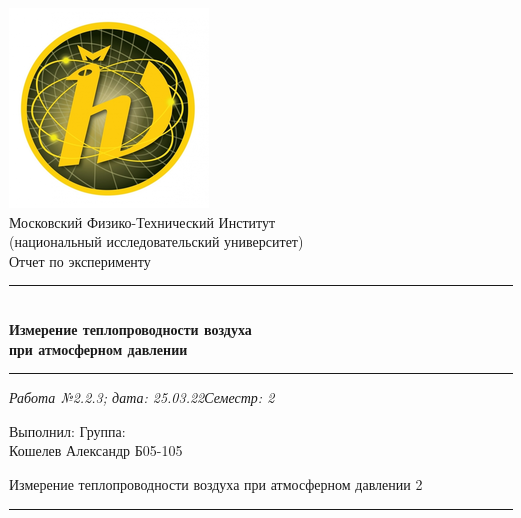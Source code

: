 \documentclass[12pt,a4paper]{scrartcl}
\begin{document}
	\begin{titlepage}
		
		\vspace*{\fill}
		
		\begin{center}
			\includegraphics[scale=0.8]{MIPT.png}
			\\[0.7cm]\Huge Московский Физико-Технический Институт\\(национальный исследовательский университет)
			\\[2cm]\LARGE Отчет по эксперименту
			\\[0.5cm]\noindent\rule{\textwidth}{1pt}
			\\\Huge\textbf{Измерение теплопроводности воздуха\\при атмосферном давлении}
			\\[-0.5cm]\noindent\rule{\textwidth}{1pt}
		\end{center}
		
		\begin{flushleft}
			\textit{Работа №2.2.3; дата: 25.03.22}\hfill\textit{Семестр: 2}
		\end{flushleft}
		
		\vspace*{\fill}
		
		\begin{flushleft}
			Выполнил: \hspace{\fill} Группа:
			\\Кошелев Александр \hspace{\fill} Б05-105
		\end{flushleft}
	\end{titlepage}
	
	
	\begin{flushleft}
		\footnotesize{Измерение теплопроводности воздуха при атмосферном давлении} \hspace{\fill} \footnotesize{2}
		\\[-0.3cm]\noindent\rule{\textwidth}{0.3pt}
	\end{flushleft}
	
\end{document}
